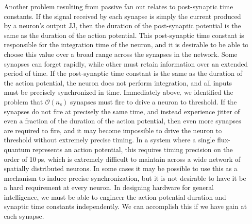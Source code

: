 Another problem resulting from passive fan out relates to post-synaptic time constants. If the signal received by each synapse is simply the current produced by a neuron's output JJ, then the duration of the post-synaptic potential is the same as the duration of the action potential. This post-synaptic time constant is responsible for the integration time of the neuron, and it is desirable to be able to choose this value over a broad range across the synapses in the network. Some synapses can forget rapidly, while other must retain information over an extended period of time. If the post-synaptic time constant is the same as the duration of the action potential, the neuron does not perform integration, and all inputs must be precisely synchronized in time. Immediately above, we identified the problem that $\mathcal{O}(n_{\mathrm{s}})$ synapses must fire to drive a neuron to threshold. If the synapses do not fire at precisely the same time, and instead experience jitter of even a fraction of the duration of the action potential, then even more synapses are required to fire, and it may become impossible to drive the neuron to threshold without extremely precise timing. In a system where a single flux-quantum represents an action potential, this requires timing precision on the order of 10\,ps, which is extremely difficult to maintain across a wide network of spatially distributed neurons. In some cases it may be possible to use this as a mechanism to induce precise synchronization, but it is not desirable to have it be a hard requirement at every neuron. In designing hardware for general intelligence, we must be able to engineer the action potential duration and synaptic time constants independently. We can accomplish this if we have gain at each synapse.

